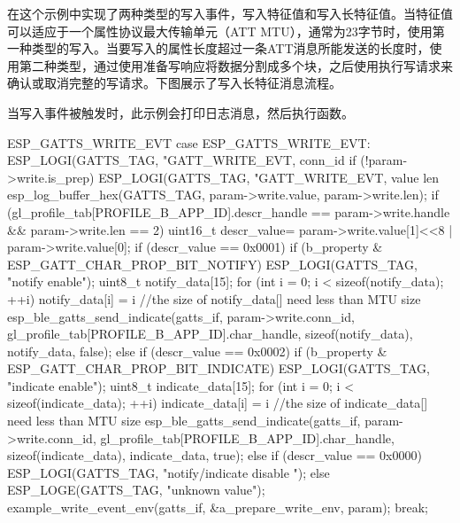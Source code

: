 \documentclass[lang=cn,newtx,10pt,scheme=chinese]{elegantbook}
\begin{document}
在这个示例中实现了两种类型的写入事件，写入特征值和写入长特征值。当特征值可以适应于一个属性协议最大传输单元（ATT MTU），通常为23字节时，使用第一种类型的写入。当要写入的属性长度超过一条ATT消息所能发送的长度时，使用第二种类型，通过使用准备写响应将数据分割成多个块，之后使用执行写请求来确认或取消完整的写请求。下图展示了写入长特征消息流程。

当写入事件被触发时，此示例会打印日志消息，然后执行函数。

\begin{mycode}{ESP\_GATTS\_WRITE\_EVT}
case ESP_GATTS_WRITE_EVT: {                          
     ESP_LOGI(GATTS_TAG, "GATT_WRITE_EVT, conn_id %
     if (!param->write.is_prep){
        ESP_LOGI(GATTS_TAG, "GATT_WRITE_EVT, value len %
        esp_log_buffer_hex(GATTS_TAG, param->write.value, param->write.len);
        if (gl_profile_tab[PROFILE_B_APP_ID].descr_handle == param->write.handle && param->write.len == 2){
            uint16_t descr_value= param->write.value[1]<<8 | param->write.value[0];
            if (descr_value == 0x0001){
                if (b_property & ESP_GATT_CHAR_PROP_BIT_NOTIFY){
                    ESP_LOGI(GATTS_TAG, "notify enable");
                    uint8_t notify_data[15];
                    for (int i = 0; i < sizeof(notify_data); ++i)
                    {
                         notify_data[i] = i%
                     }
                     //the size of notify_data[] need less than MTU size
                     esp_ble_gatts_send_indicate(gatts_if, param->write.conn_id,  
                                                 gl_profile_tab[PROFILE_B_APP_ID].char_handle,  
                                                 sizeof(notify_data),  
                                                 notify_data, false);
                }
            }else if (descr_value == 0x0002){
                 if (b_property & ESP_GATT_CHAR_PROP_BIT_INDICATE){
                     ESP_LOGI(GATTS_TAG, "indicate enable");
                     uint8_t indicate_data[15];
                     for (int i = 0; i < sizeof(indicate_data); ++i)
                     {
                         indicate_data[i] = i %
                      }
                      //the size of indicate_data[] need less than MTU size
                     esp_ble_gatts_send_indicate(gatts_if, param->write.conn_id,  
                                                 gl_profile_tab[PROFILE_B_APP_ID].char_handle,  
                                                 sizeof(indicate_data),  
                                                 indicate_data, true);
                }
             }
             else if (descr_value == 0x0000){
                 ESP_LOGI(GATTS_TAG, "notify/indicate disable ");
             }else{
                 ESP_LOGE(GATTS_TAG, "unknown value");
             }
        }
    }
    example_write_event_env(gatts_if, &a_prepare_write_env, param);
    break;
}
\end{mycode}
\end{document}
